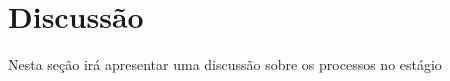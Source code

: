 

\section{Discussão}
    \label{sec:discussao}
    
    Nesta seção irá apresentar uma discussão sobre os processos no estágio 